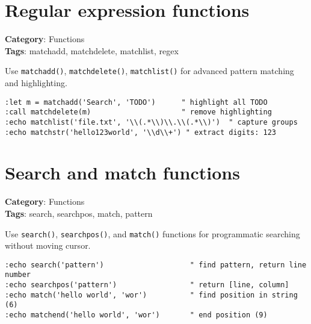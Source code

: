 {\section{Regular expression functions}

\textbf{Category}: Functions\\ \textbf{Tags}: matchadd, matchdelete, matchlist, regex
\vspace{0.5cm}

Use {\footnotesize \Verb§matchadd()§}, {\footnotesize \Verb§matchdelete()§}, {\footnotesize \Verb§matchlist()§} for advanced pattern matching and highlighting.

\begin{Exa*}{}
\begin{Verbatim}[fontsize=\footnotesize, breaklines, breakanywhere]
:let m = matchadd('Search', 'TODO')      " highlight all TODO
:call matchdelete(m)                     " remove highlighting
:echo matchlist('file.txt', '\\(.*\\)\\.\\(.*\\)')  " capture groups
:echo matchstr('hello123world', '\\d\\+') " extract digits: 123
\end{Verbatim}
\end{Exa*}

\section{Search and match functions}

\textbf{Category}: Functions\\ \textbf{Tags}: search, searchpos, match, pattern
\vspace{0.5cm}

Use {\footnotesize \Verb§search()§}, {\footnotesize \Verb§searchpos()§}, and {\footnotesize \Verb§match()§} functions for programmatic searching without moving cursor.

\begin{Exa*}{}
\begin{Verbatim}[fontsize=\footnotesize, breaklines, breakanywhere]
:echo search('pattern')                    " find pattern, return line number
:echo searchpos('pattern')                 " return [line, column]
:echo match('hello world', 'wor')          " find position in string (6)
:echo matchend('hello world', 'wor')       " end position (9)
\end{Verbatim}
\end{Exa*}

}

